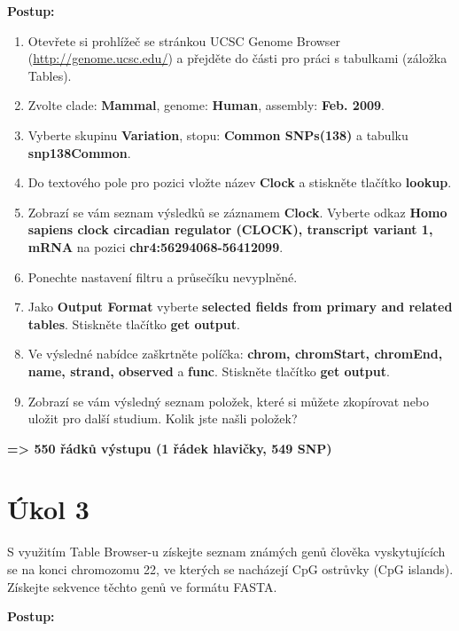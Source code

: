 \documentclass[11pt]{article}
\begin{document}
\textbf{Postup:}
\begin{enumerate}
\item Otevřete si prohlížeč se stránkou UCSC Genome Browser
(\url{http://genome.ucsc.edu/}) a přejděte do části pro práci s tabulkami (záložka
Tables).
\item Zvolte clade: \textbf{Mammal}, genome: \textbf{Human}, assembly: \textbf{Feb. 2009}.
\item Vyberte skupinu \textbf{Variation}, stopu: \textbf{Common SNPs(138)} a tabulku \textbf{snp138Common}.
\item Do textového pole pro pozici vložte název \textbf{Clock} a stiskněte tlačítko \textbf{lookup}.
\item Zobrazí se vám seznam výsledků se záznamem \textbf{Clock}. Vyberte odkaz \textbf{Homo sapiens
clock circadian regulator (CLOCK), transcript variant 1, mRNA} na pozici
\textbf{chr4:56294068-56412099}.
\item Ponechte nastavení filtru a průsečíku nevyplněné.
\item Jako \textbf{Output Format} vyberte \textbf{selected fields from primary and related
tables}. Stiskněte tlačítko \textbf{get output}.
\item Ve výsledné nabídce zaškrtněte políčka: \textbf{chrom, chromStart, chromEnd, name,
strand, observed} a \textbf{func}. Stiskněte tlačítko \textbf{get output}.
\item Zobrazí se vám výsledný seznam položek, které si můžete zkopírovat nebo
uložit pro další studium. Kolik jste našli položek?
\end{enumerate}

\textbf{=> 550 řádků výstupu (1 řádek hlavičky, 549 SNP)}

\section{Úkol 3}
\label{sec:orgb92bbd8}
S využitím Table Browser-u získejte seznam známých genů člověka vyskytujících se
na konci chromozomu 22, ve kterých se nacházejí CpG ostrůvky (CpG
islands). Získejte sekvence těchto genů ve formátu FASTA.

\textbf{Postup:}
\end{document}
